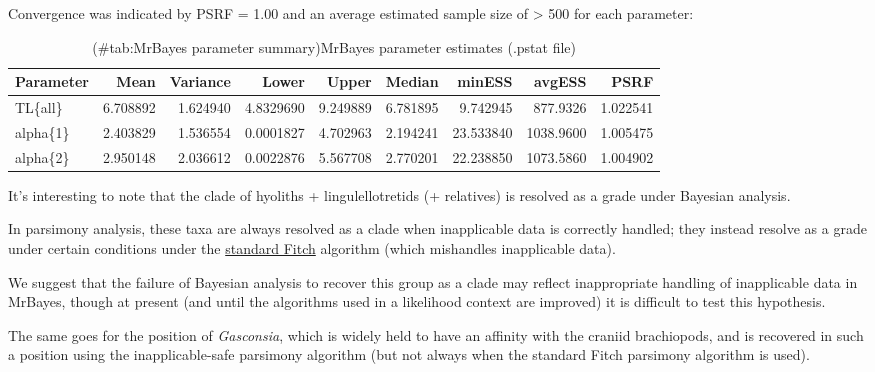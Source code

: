 \documentclass[]{book}
\theoremstyle{definition}
\theoremstyle{definition}
\theoremstyle{definition}
\theoremstyle{remark}
\begin{document}
Convergence was indicated by PSRF = 1.00 and an average estimated sample
size of \textgreater{} 500 for each parameter:

\begin{table}

\caption{(\#tab:MrBayes parameter summary)MrBayes parameter estimates (.pstat file)}
\centering
\begin{tabular}[t]{l|r|r|r|r|r|r|r|r}
\hline
Parameter & Mean & Variance & Lower & Upper & Median & minESS & avgESS & PSRF\\
\hline
TL\{all\} & 6.708892 & 1.624940 & 4.8329690 & 9.249889 & 6.781895 & 9.742945 & 877.9326 & 1.022541\\
\hline
alpha\{1\} & 2.403829 & 1.536554 & 0.0001827 & 4.702963 & 2.194241 & 23.533840 & 1038.9600 & 1.005475\\
\hline
alpha\{2\} & 2.950148 & 2.036612 & 0.0022876 & 5.567708 & 2.770201 & 22.238850 & 1073.5860 & 1.004902\\
\hline
\end{tabular}
\end{table}

It's interesting to note that the clade of hyoliths + lingulellotretids
(+ relatives) is resolved as a grade under Bayesian analysis.

In parsimony analysis, these taxa are always resolved as a clade when
inapplicable data is correctly handled; they instead resolve as a grade
under certain conditions under the \protect\hyperlink{TNT}{standard
Fitch} algorithm (which mishandles inapplicable data).

We suggest that the failure of Bayesian analysis to recover this group
as a clade may reflect inappropriate handling of inapplicable data in
MrBayes, though at present (and until the algorithms used in a
likelihood context are improved) it is difficult to test this
hypothesis.

The same goes for the position of \emph{Gasconsia}, which is widely held
to have an affinity with the craniid brachiopods, and is recovered in
such a position using the inapplicable-safe parsimony algorithm (but not
always when the standard Fitch parsimony algorithm is used).


\end{document}
